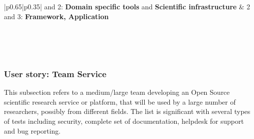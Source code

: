 \begin{center}
    \tabletail{\hline}
    \label{tab:rs_recc07}
    \small
    \begin{supertabular}{|p{0.65\linewidth}|p{0.35\linewidth}|}  and 2: \textbf{Domain specific tools} and  \textbf{Scientific infrastructure} &
    2 and 3: \textbf{Framework, Application} \\ \hline \hline

     \\ \hline
     \\ \hline
     \\ \hline

\end{supertabular}
\end{center}

\subsubsection{User story: Team Service}

This subsection refers to a medium/large team developing an Open Source scientific research service or platform, that will be used by a large number of researchers, possibly from different fields. The list is significant with several types of tests including security, complete set of documentation, helpdesk for support and bug reporting.

